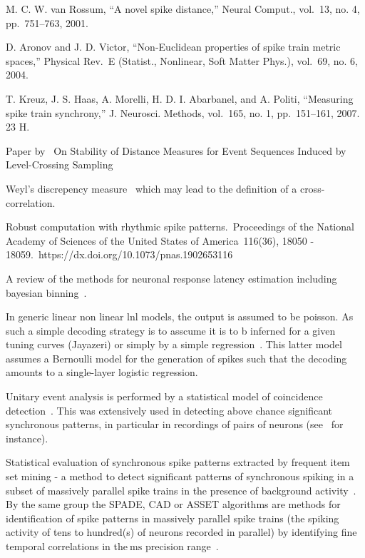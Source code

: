 \documentclass[brainsci, %
               review,submit,pdftex,moreauthors%
               ]{Definitions/mdpi}
\newcommand{\ms}{\si{\milli\second}}%
\begin{document}
M. C. W. van Rossum, ``A novel spike distance,'' Neural Comput., vol.~13, no. 4, pp.~751--763, 2001. 

D. Aronov and J. D. Victor, ``Non-Euclidean properties of spike train metric spaces,'' Physical Rev.~E (Statist., Nonlinear, Soft Matter Phys.), vol.~69, no. 6, 2004.

T. Kreuz, J. S. Haas, A. Morelli, H. D. I. Abarbanel, and A. Politi, ``Measuring spike train synchrony,'' J. Neurosci. Methods, vol.~165, no. 1, pp.~151--161, 2007. 23 H.

Paper by~\citep{moser_stability_2014} On Stability of Distance Measures for Event Sequences Induced by Level-Crossing Sampling

Weyl's discrepency measure~\citep{weyl_ber_1916} which may lead to the definition of a cross-correlation.

Robust computation with rhythmic spike patterns.~Proceedings of the National Academy of Sciences of the United States of America~116(36), 18050 - 18059.~https://dx.doi.org/10.1073/pnas.1902653116

A review of the methods for neuronal response latency estimation including bayesian binning~\citep{levakova_review_2015}.



In generic linear non linear lnl models, the output is assumed to be poisson. As such a simple decoding strategy is to asscume it is to b inferned for a given tuning curves (Jayazeri) or simply by a simple regression~\citep{berens_fast_2012}. This latter model assumes a Bernoulli model for the generation of spikes such that the decoding amounts to a single-layer logistic regression.

Unitary event analysis is performed by a statistical model of coincidence detection~\citep{grun_unitary_2010}. This was extensively used in detecting above chance significant synchronous patterns, in particular in recordings of pairs of neurons (see~\citep{riehle_spike_1997} for instance).

Statistical evaluation of synchronous spike patterns extracted by frequent item set mining - a method to detect significant patterns of synchronous spiking in a subset of massively parallel spike trains in the presence of background activity~\citep{torre_statistical_2013}. By the same group the SPADE, CAD or ASSET algorithms are methods for identification of spike patterns in massively parallel spike trains (the spiking activity of tens to hundred(s) of neurons recorded in parallel) by identifying fine temporal correlations in the$~\ms$ precision range~\citep{quaglio_methods_2018}.
\end{document}
